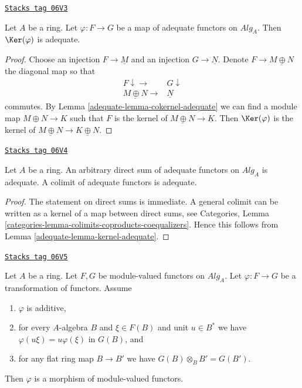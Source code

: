 \begin{lemma}
\label{adequate-lemma-kernel-adequate}
\href{https://stacks.math.columbia.edu/tag/06V3}{\texttt{Stacks tag 06V3}}

Let $A$ be a ring.
Let $\varphi : F \to G$ be a map of adequate functors on $\textit{Alg}_A$.
Then $\Ker(\varphi)$ is adequate.
\end{lemma}

\begin{proof}

Choose an injection $F \to \underline{M}$ and an injection
$G \to \underline{N}$. Denote $F \to \underline{M \oplus N}$
the diagonal map so that
$$
\begin{array}{cc}F \downarrow\longrightarrow & G \downarrow \\ \underline{M \oplus N} \longrightarrow & \underline{N}\end{array}
$$
commutes. By
Lemma \ref{adequate-lemma-cokernel-adequate}
we can find a module map $M \oplus N \to K$ such that
$F$ is the kernel of $\underline{M \oplus N} \to \underline{K}$.
Then $\Ker(\varphi)$ is the kernel of
$\underline{M \oplus N} \to \underline{K \oplus N}$.
\end{proof}

\begin{lemma}
\label{adequate-lemma-colimit-adequate}
\href{https://stacks.math.columbia.edu/tag/06V4}{\texttt{Stacks tag 06V4}}

Let $A$ be a ring.
An arbitrary direct sum of adequate functors on $\textit{Alg}_A$
is adequate. A colimit of adequate functors is adequate.
\end{lemma}

\begin{proof}

The statement on direct sums is immediate.
A general colimit can be written as a kernel of a map between
direct sums, see
Categories, Lemma \ref{categories-lemma-colimits-coproducts-coequalizers}.
Hence this follows from
Lemma \ref{adequate-lemma-kernel-adequate}.
\end{proof}

\begin{lemma}
\label{adequate-lemma-flat-linear-functor}
\href{https://stacks.math.columbia.edu/tag/06V5}{\texttt{Stacks tag 06V5}}

Let $A$ be a ring.
Let $F, G$ be module-valued functors on $\textit{Alg}_A$.
Let $\varphi : F \to G$ be a transformation of functors. Assume
\begin{enumerate}
\item $\varphi$ is additive,
\item for every $A$-algebra $B$ and $\xi \in F(B)$ and unit
$u \in B^*$ we have $\varphi(u\xi) = u\varphi(\xi)$ in $G(B)$, and
\item for any flat ring map $B \to B'$ we have
$G(B) \otimes_B B' = G(B')$.
\end{enumerate}
Then $\varphi$ is a morphism of module-valued functors.
\end{lemma}

